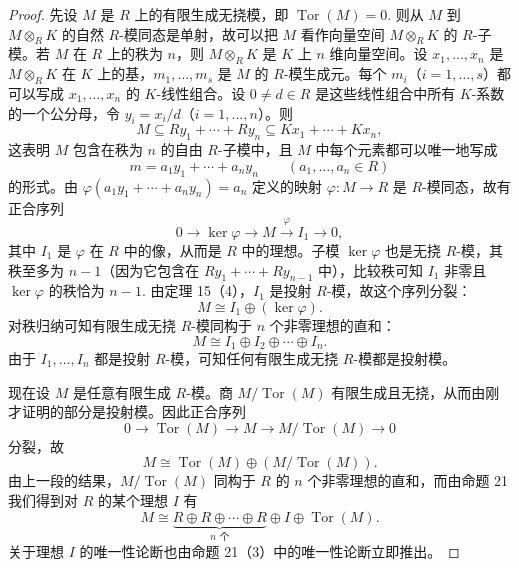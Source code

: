 \begin{proof}
先设 \(M\) 是 \(R\) 上的有限生成无挠模，即 \(\operatorname{Tor}(M) = 0\). 则从 \(M\) 到 \(M \otimes_RK\) 的自然 \(R\)-模同态是单射，故可以把 \(M\) 看作向量空间 \(M \otimes_RK\) 的 \(R\)-子模。若 \(M\) 在 \(R\) 上的秩为 \(n\)，则 \(M \otimes_RK\) 是 \(K\) 上 \(n\) 维向量空间。设 \(x_1, \ldots, x_n\) 是 \(M \otimes_RK\) 在 \(K\) 上的基，\(m_1, \ldots, m_s\) 是 \(M\) 的 \(R\)-模生成元。每个 \(m_i\)（\(i = 1, \ldots, s\)）都可以写成 \(x_1, \ldots, x_n\) 的 \(K\)-线性组合。设 \(0 \neq d \in R\) 是这些线性组合中所有 \(K\)-系数的一个公分母，令 \(y_i = x_i/d\)（\(i = 1, \ldots, n\)）。则
\[
M \subseteq Ry_1+\cdots+Ry_n \subseteq Kx_1+\cdots+Kx_n,
\]
这表明 \(M\) 包含在秩为 \(n\) 的自由 \(R\)-子模中，且 \(M\) 中每个元素都可以唯一地写成
\[
m = a_1y_1+\cdots+a_ny_n \qquad (a_1, \ldots, a_n \in R)
\]
的形式。由 \(\varphi(a_1y_1+\cdots+a_ny_n) = a_n\) 定义的映射 \(\varphi : M \to R\) 是 \(R\)-模同态，故有正合序列
\[
0 \to \ker\varphi \to M \xrightarrow{\varphi} I_1 \to 0,
\]
其中 \(I_1\) 是 \(\varphi\) 在 \(R\) 中的像，从而是 \(R\) 中的理想。子模 \(\ker\varphi\) 也是无挠 \(R\)-模，其秩至多为 \(n-1\)（因为它包含在 \(Ry_1+\cdots+Ry_{n-1}\) 中），比较秩可知 \(I_1\) 非零且 \(\ker\varphi\) 的秩恰为 \(n-1\). 由定理 15（4），\(I_1\) 是投射 \(R\)-模，故这个序列分裂：
\[
M \cong I_1 \oplus (\ker\varphi).
\]
对秩归纳可知有限生成无挠 \(R\)-模同构于 \(n\) 个非零理想的直和：
\[
M \cong I_1 \oplus I_2 \oplus \cdots \oplus I_n.
\]
由于 \(I_1, \ldots, I_n\) 都是投射 \(R\)-模，可知任何有限生成无挠 \(R\)-模都是投射模。

现在设 \(M\) 是任意有限生成 \(R\)-模。商 \(M/\operatorname{Tor}(M)\) 有限生成且无挠，从而由刚才证明的部分是投射模。因此正合序列
\[
0 \to \operatorname{Tor}(M) \to M \to M/\operatorname{Tor}(M) \to 0
\]
分裂，故
\[
M \cong \operatorname{Tor}(M) \oplus (M/\operatorname{Tor}(M)).
\]
由上一段的结果，\(M/\operatorname{Tor}(M)\) 同构于 \(R\) 的 \(n\) 个非零理想的直和，而由命题 21 我们得到对 \(R\) 的某个理想 \(I\) 有
\[
M \cong \underbrace{R \oplus R \oplus \cdots \oplus R}_{n \text{ 个}} \oplus I \oplus \operatorname{Tor}(M).
\]
关于理想 \(I\) 的唯一性论断也由命题 21（3）中的唯一性论断立即推出。


\end{proof}
